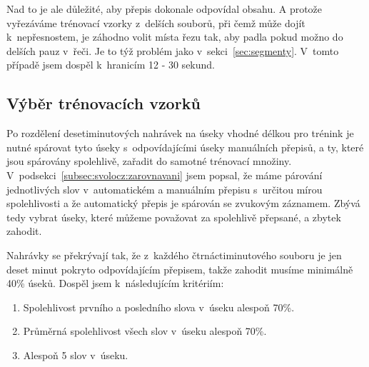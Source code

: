 Nad to je ale důležité, aby přepis dokonale odpovídal obsahu. A protože
vyřezáváme trénovací vzorky z~delších souborů, při čemž může dojít
k~nepřesnostem, je záhodno volit místa řezu tak, aby padla pokud možno do
delších pauz v~řeči. Je to týž problém jako v~sekci~\ref{sec:segmenty}. V~tomto
případě jsem dospěl k~hranicím 12 - 30 sekund.

\subsection{Výběr trénovacích vzorků}

Po rozdělení desetiminutových nahrávek na úseky vhodné délkou pro trénink je
nutné spárovat tyto úseky s~odpovídajícími úseky manuálních přepisů, a ty, které
jsou spárovány spolehlivě, zařadit do samotné trénovací množiny.
V~podsekci~\ref{subsec:svolocz:zarovnavani} jsem popsal, že máme párování
jednotlivých slov v~automatickém a manuálním přepisu s~určitou mírou
spolehlivosti a že automatický přepis je spárován se zvukovým záznamem. Zbývá
tedy vybrat úseky, které můžeme považovat za spolehlivě přepsané, a zbytek
zahodit.

Nahrávky se překrývají tak, že z~každého čtrnáctiminutového souboru je jen deset
minut pokryto odpovídajícím přepisem, takže zahodit musíme minimálně 40\% úseků.
Dospěl jsem k~následujícím kritériím:

\begin{enumerate}
\item{Spolehlivost prvního a posledního slova v~úseku alespoň 70\%.}
\item{Průměrná spolehlivost všech slov v~úseku alespoň 70\%.}
\item{Alespoň 5 slov v~úseku.}
\end{enumerate}



%
